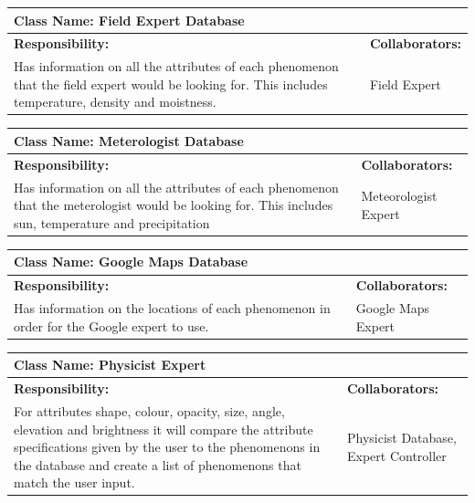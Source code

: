 \documentclass[]{article}
\begin{document}
	\begin{table}[ht]
		\centering
		\begin{tabular}{|p{5cm}|p{5cm}|}
		\hline 
		 \multicolumn{2}{|l|}{\textbf{Class Name:  Field Expert Database}} \\
		\hline
		\textbf{Responsibility:} & \textbf{Collaborators:} \\
		\hline
		Has information on all the attributes of each phenomenon that the field expert would be looking for. This includes  temperature, density and moistness. \vspace{1in} & Field Expert\\
		\hline
		\end{tabular}
	\end{table}

	\begin{table}[ht]
		\centering
		\begin{tabular}{|p{5cm}|p{5cm}|}
		\hline 
		 \multicolumn{2}{|l|}{\textbf{Class Name: Meterologist Database}} \\
		\hline
		\textbf{Responsibility:} & \textbf{Collaborators:} \\
		\hline
		Has information on all the attributes of each phenomenon that the meterologist would be looking for. This includes  sun, temperature and precipitation \vspace{1in} & Meteorologist Expert\\
		\hline
		\end{tabular}
	\end{table}

	\begin{table}[ht]
		\centering
		\begin{tabular}{|p{5cm}|p{5cm}|}
		\hline 
		 \multicolumn{2}{|l|}{\textbf{Class Name: Google Maps Database}} \\
		\hline
		\textbf{Responsibility:} & \textbf{Collaborators:} \\
		\hline
		Has information on the locations of each phenomenon in order for the Google expert to use. \vspace{1in} & Google Maps Expert\\
		\hline
		\end{tabular}
	\end{table}

	\begin{table}[ht]
		\centering
		\begin{tabular}{|p{5cm}|p{5cm}|}
		\hline 
		 \multicolumn{2}{|l|}{\textbf{Class Name: Physicist Expert}} \\
		\hline
		\textbf{Responsibility:} & \textbf{Collaborators:} \\
		\hline
		For attributes shape, colour, opacity, size, angle, elevation and brightness it will compare the attribute specifications given by the user to the phenomenons in the database and create a list of phenomenons that match the user input.  \vspace{1in} & Physicist Database, Expert Controller \\
		\hline
		\end{tabular}
	\end{table}
	
\end{document}
